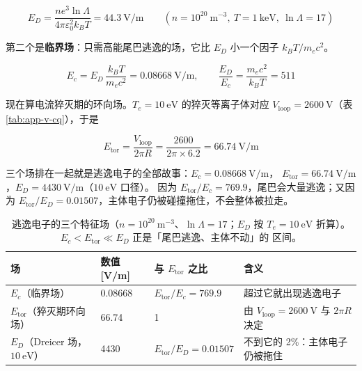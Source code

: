 \begin{equation}
E_D = \frac{n e^3 \ln\Lambda}{4\pi\varepsilon_0^2 k_B T}
= 44.3\ \mathrm{V/m}
\qquad
(n=10^{20}\ \mathrm{m^{-3}},\ T=1\ \mathrm{keV},\ \ln\Lambda=17)
\label{eq:app-v-ed}
\end{equation}

第二个是\textbf{临界场}：只需高能尾巴逃逸的场，它比 $E_D$ 小一个因子 $k_BT/m_ec^2$。

\begin{equation}
E_c = E_D\,\frac{k_B T}{m_e c^2} = 0.08668\ \mathrm{V/m},
\qquad
\frac{E_D}{E_c} = \frac{m_e c^2}{k_B T} = 511
\label{eq:app-v-ec}
\end{equation}

现在算电流猝灭期的环向场。$T_e=10\ \mathrm{eV}$ 的猝灭等离子体对应
$V_{\mathrm{loop}}=2600\ \mathrm{V}$（表 \ref{tab:app-v-cq}），于是

\begin{equation}
E_{\mathrm{tor}} = \frac{V_{\mathrm{loop}}}{2\pi R}
= \frac{2600}{2\pi\times6.2} = 66.74\ \mathrm{V/m}
\label{eq:app-v-eloop}
\end{equation}

三个场排在一起就是逃逸电子的全部故事：$E_c=0.08668\ \mathrm{V/m}$，
$E_{\mathrm{tor}}=66.74\ \mathrm{V/m}$，$E_D=4430\ \mathrm{V/m}$（$10\ \mathrm{eV}$ 口径）。
因为 $E_{\mathrm{tor}}/E_c=769.9$，尾巴会大量逃逸；又因为
$E_{\mathrm{tor}}/E_D=0.01507$，主体电子仍被碰撞拖住，不会整体被拉走。

\begin{table}[htbp]
\centering
\small
\caption{逃逸电子的三个特征场（$n=10^{20}\ \mathrm{m^{-3}}$、$\ln\Lambda=17$；$E_D$ 按
$T_e=10\ \mathrm{eV}$ 折算）。$E_c<E_{\mathrm{tor}}\ll E_D$ 正是「尾巴逃逸、主体不动」的
区间。}
\label{tab:app-v-fields}
\begin{tabular}{@{}p{3.4cm}p{2.2cm}p{2.8cm}p{3.6cm}@{}}
\toprule
场 & 数值 [V/m] & 与 $E_{\mathrm{tor}}$ 之比 & 含义 \\
\midrule
$E_c$（临界场） & 0.08668 & $E_{\mathrm{tor}}/E_c=769.9$ & 超过它就出现逃逸电子 \\
$E_{\mathrm{tor}}$（猝灭期环向场） & 66.74 & 1 & 由 $V_{\mathrm{loop}}=2600\ \mathrm{V}$ 与 $2\pi R$ 决定 \\
$E_D$（Dreicer 场，$10\ \mathrm{eV}$） & 4430 & $E_{\mathrm{tor}}/E_D=0.01507$ & 不到它的 2\%：主体电子仍被拖住 \\
\bottomrule
\end{tabular}

\end{table}

